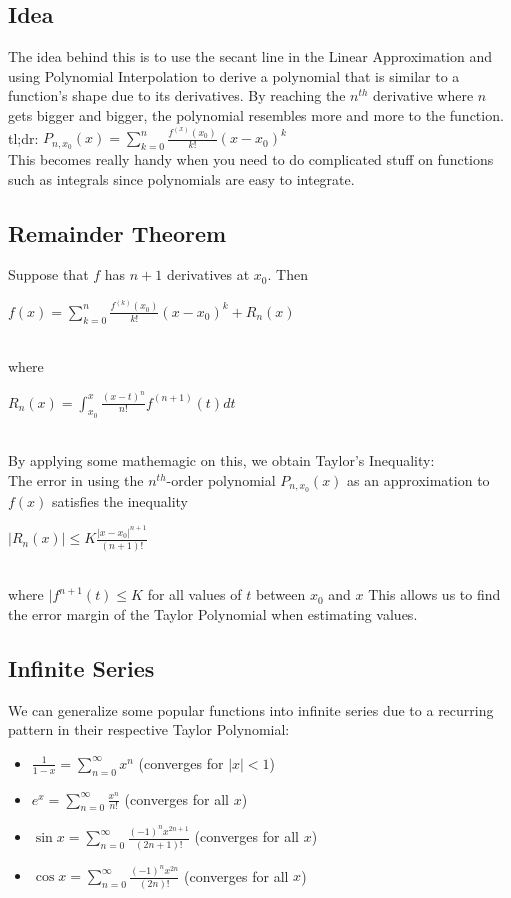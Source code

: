 \documentclass[12pt]{report}
\begin{document}
		\subsection{Idea}
			The idea behind this is to use the secant line in the Linear Approximation and using Polynomial Interpolation to derive a polynomial that is similar to a function's shape due to its derivatives. By reaching the $n^{th}$ derivative where $n$ gets bigger and bigger, the polynomial resembles more and more to the function.\\
			tl;dr: $P_{n,x_0}(x) = \sum_{k=0}^{n} \frac{f^{(x)}(x_0)}{k!}(x-x_0)^k$\\
			This becomes really handy when you need to do complicated stuff on functions such as integrals since polynomials are easy to integrate.
		\subsection{Remainder Theorem}
			Suppose that $f$ has $n+1$ derivatives at $x_0$. Then \\
			\centerline{$f(x) = \sum_{k=0}^{n} \frac{f^{(k)}(x_0)}{k!}(x-x_0)^k+R_n(x)$}\\
			where\\
			\centerline{$R_n(x) = \int_{x_0}^{x} \frac{(x-t)^n}{n!} f^{(n+1)}(t)dt$}\\
			By applying some mathemagic on this, we obtain Taylor's Inequality:\\
			The error in using the $n^{th}$-order polynomial $P_{n,x_0}(x)$ as an approximation to $f(x)$ satisfies the inequality \\
			\centerline{$|R_n(x)| \leq K \frac{|x-x_0|^{n+1}}{(n+1)!}$}\\
			where $|f^{n+1}(t) \leq K$ for all values of $t$ between $x_0$ and $x$
			This allows us to find the error margin of the Taylor Polynomial when estimating values. 
		\subsection{Infinite Series}
			We can generalize some popular functions into infinite series due to a recurring pattern in their respective Taylor Polynomial:
			\begin{itemize}
				\item $\frac{1}{1-x} = \sum_{n=0}^{\infty} x^n$ (converges for $|x| < 1$)
				\item $e^x = \sum_{n=0}^{\infty} \frac{x^n}{n!}$ (converges for all $x$)
				\item $\sin x = \sum_{n=0}^{\infty} \frac{(-1)^nx^{2n+1}}{(2n+1)!}$ (converges for all $x$)
				\item $\cos x = \sum_{n=0}^{\infty} \frac{(-1)^nx^{2n}}{(2n)!}$ (converges for all $x$)
			\end{itemize}
\end{document}
